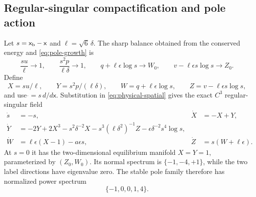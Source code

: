 \documentclass[11pt,reqno]{amsart}
\numberwithin{equation}{section}
\theoremstyle{definition}
\theoremstyle{remark}
\begin{document}
\subsection{Regular-singular compactification and pole action}

Let $s=\mathsf x_{\rm b}-\mathsf x$ and $\ell=\sqrt6\,\delta$.  The sharp
balance obtained from the conserved energy and \eqref{eq:pole-growth} is
\begin{equation}\label{eq:pole-balance}
 \frac{su}{\ell}\to1,\qquad
 \frac{s^2p}{\ell\delta}\to1,\qquad
 q+\ell\epsilon\log s\to W_0,\qquad
 v-\ell\epsilon s\log s\to Z_0.
\end{equation}
Define
\begin{equation}\label{eq:pole-compact-vars}
 X=su/\ell,\qquad Y=s^2p/(\ell\delta),\qquad
 W=q+\ell\epsilon\log s,\qquad
 Z=v-\ell\epsilon s\log s,
\end{equation}
and use $\dot{}=s\,d/d\mathsf x$.  Substitution in
\eqref{eq:physical-spatial} gives the exact $C^3$ regular-singular field
\begin{equation}\label{eq:pole-compact-field}
 \begin{aligned}
  \dot s&=-s,& \dot X&=-X+Y,\\
  \dot Y&=-2Y+2X^3-s^2\delta^{-2}X
       -s^3(\ell\delta^2)^{-1}Z
       -\epsilon\delta^{-2}s^4\log s,\\
  \dot W&=\ell\epsilon(X-1)-a\epsilon s,&
  \dot Z&=s(W+\ell\epsilon).
 \end{aligned}
\end{equation}
At $s=0$ it has the two-dimensional equilibrium manifold
$X=Y=1$, parameterized by $(Z_0,W_0)$.  Its normal spectrum is
$\{-1,-4,+1\}$, while the two label directions have eigenvalue zero.  The
stable pole family therefore has normalized power spectrum
\begin{equation}\label{eq:pole-spectrum}
 \{-1,0,0,1,4\}.
\end{equation}
\end{document}
